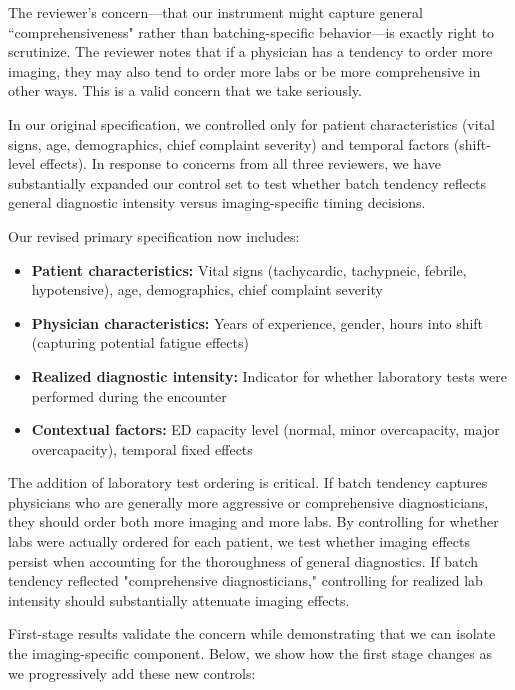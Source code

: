 \documentclass[11pt]{article}
\newcommand{\1}{\hbox{\rm 1\kern-.35em 1}}
\begin{document}
The reviewer's concern—that our instrument might capture general ``comprehensiveness" rather than batching-specific behavior—is exactly right to scrutinize. The reviewer notes that if a physician has a tendency to order more imaging, they may also tend to order more labs or be more comprehensive in other ways. This is a valid concern that we take seriously.

In our original specification, we controlled only for patient characteristics (vital signs, age, demographics, chief complaint severity) and temporal factors (shift-level effects). In response to concerns from all three reviewers, we have substantially expanded our control set to test whether batch tendency reflects general diagnostic intensity versus imaging-specific timing decisions.

Our revised primary specification now includes:

\begin{itemize}
\item \textbf{Patient characteristics:} Vital signs (tachycardic, tachypneic, febrile, hypotensive), age, demographics, chief complaint severity
\item \textbf{Physician characteristics:} Years of experience, gender, hours into shift (capturing potential fatigue effects)
\item \textbf{Realized diagnostic intensity:} Indicator for whether laboratory tests were performed during the encounter
\item \textbf{Contextual factors:} ED capacity level (normal, minor overcapacity, major overcapacity), temporal fixed effects
\end{itemize}

The addition of laboratory test ordering is critical. If batch tendency captures physicians who are generally more aggressive or comprehensive diagnosticians, they should order both more imaging and more labs. By controlling for whether labs were actually ordered for each patient, we test whether imaging effects persist when accounting for the thoroughness of general diagnostics. If batch tendency reflected "comprehensive diagnosticians," controlling for realized lab intensity should substantially attenuate imaging effects.

First-stage results validate the concern while demonstrating that we can isolate the imaging-specific component. Below, we show how the first stage changes as we progressively add these new controls:
\end{document}
